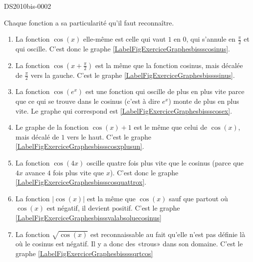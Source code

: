 
\begin{corrige}{DS2010bis-0002}

	Chaque fonction a sa particularité qu'il faut reconnaître.
	\begin{enumerate}
		\item
			La fonction $\cos(x)$ elle-même est celle qui vaut $1$ en $0$, qui s'annule en $\frac{ \pi }{2}$ et qui oscille. C'est donc le graphe \ref{LabelFigExerciceGraphesbissscosinus}.
		\item
			La fonction $\cos(x+\frac{ \pi }{2})$ est la même que la fonction cosinus, mais décalée de $\frac{ \pi }{2}$ vers la gauche. C'est le graphe  \ref{LabelFigExerciceGraphesbissssinus}.
		\item
			La fonction $\cos( e^{x})$ est une fonction qui oscille de plus en plus vite parce que ce qui se trouve dans le cosinus (c'est à dire  $ e^{x}$) monte de plus en plus vite. Le graphe qui correspond est \ref{LabelFigExerciceGraphesbissscosex}.
		\item
			Le graphe de la fonction $\cos(x)+1$ est le même que celui de $\cos(x)$, mais décalé de $1$ vers le haut. C'est le graphe \ref{LabelFigExerciceGraphesbissscosxplusun}.
		\item
			La fonction $\cos(4x)$ oscille quatre fois plus vite que le cosinus (parce que $4x$ avance $4$ fois plus vite que $x$). C'est donc le graphe \ref{LabelFigExerciceGraphesbissscosquattrox}.
		\item
			La fonction $| \cos(x) |$ est la même que $\cos(x)$ sauf que partout où $\cos(x)$ est négatif, il devient positif. C'est le graphe \ref{LabelFigExerciceGraphesbisssvalabsoluecosinus}
		\item
			La fonction $\sqrt{\cos(x)}$ est reconnaissable au fait qu'elle n'est pas définie là où le cosinus est négatif. Il y a donc des «trous» dans son domaine. C'est le graphe \ref{LabelFigExerciceGraphesbissssqrtcos}
	\end{enumerate}
	
\end{corrige}
